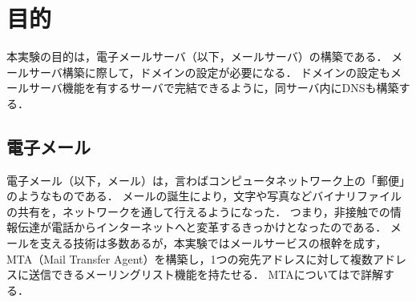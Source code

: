 \chapter{目的}
本実験の目的は，電子メールサーバ（以下，メールサーバ）の構築である．
メールサーバ構築に際して，ドメインの設定が必要になる．
ドメインの設定もメールサーバ機能を有するサーバで完結できるように，同サーバ内にDNSも構築する．
\section{電子メール}
電子メール（以下，メール）は，言わばコンピュータネットワーク上の「郵便」のようなものである．
メールの誕生により，文字や写真などバイナリファイルの共有を，ネットワークを通して行えるようになった．
つまり，非接触での情報伝達が電話からインターネットへと変革するきっかけとなったのである．
メールを支える技術は多数あるが，本実験ではメールサービスの根幹を成す，MTA（Mail Transfer Agent）を構築し，1つの宛先アドレスに対して複数アドレスに送信できるメーリングリスト機能を持たせる．
MTAについてはで詳解する．
